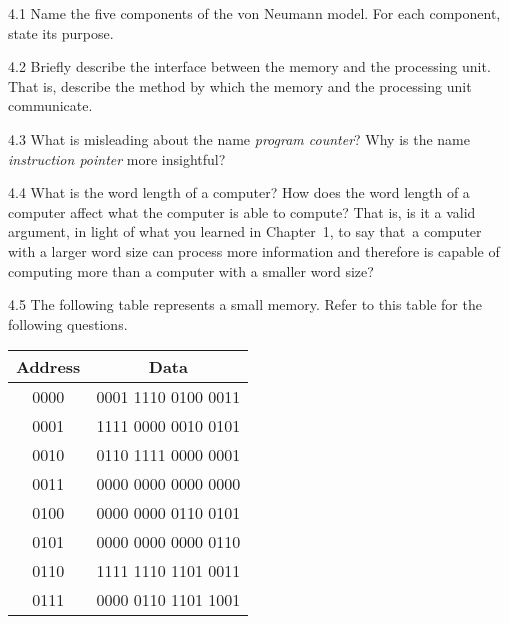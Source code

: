 \documentclass{patt}
\begin{document}
\FloatBarrier

\begin{exercises}

\vspace{-6pt}

\item[4.1] Name the five components of the von Neumann model. For each component, state
its purpose.

\item[4.2] Briefly describe the interface between the memory and the processing unit.
That is, describe the method by which the memory and the processing unit
communicate.

\item[4.3] What is misleading about the name {\em program counter}? Why is the name
{\em instruction pointer} more insightful?

\item[4.4] What is the word length of a computer? How does the word
  length of a computer affect what the computer is able to compute?
  That is, is it a valid argument, in light of what you learned in
  Chapter~1, to say that~a computer with a larger word size can
  process more information and therefore is capable of computing more
  than a computer with a smaller word size?

\item[4.5] The following table represents a small memory. Refer to
  this table for the following questions.

\begin{inlinetable}
\begin{tabular}{cc}\hline
\rule{0pt}{10pt} {Address}\rule{0pt}{10pt} & {Data} \\ \hline
            \rule{0pt}{10pt}0000\rule{0pt}{10pt} &  0001 1110 0100 0011 \\[3pt]
            0001 &  1111 0000 0010 0101 \\[3pt]
            0010 &  0110 1111 0000 0001 \\[3pt]
            0011 &  0000 0000 0000 0000 \\[3pt]
            0100 &  0000 0000 0110 0101 \\[3pt]
            0101 &  0000 0000 0000 0110 \\[3pt]
            0110 &  1111 1110 1101 0011 \\[3pt]
         \rule{0pt}{10pt}  0111\rule{0pt}{10pt} &  0000 0110 1101 1001
            \\\hline
\end{tabular}
\end{inlinetable}\pagebreak


\end{exercises}
\end{document}
